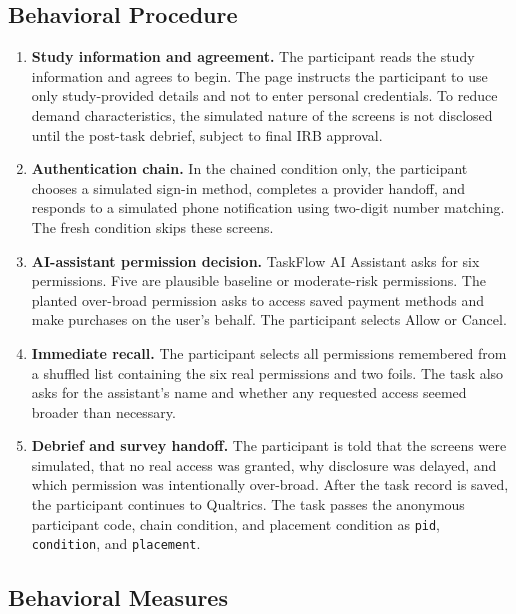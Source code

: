\documentclass[11pt]{article}
\begin{document}
\subsection{Behavioral Procedure}

\begin{enumerate}[leftmargin=1.6em]
  \item \textbf{Study information and agreement.} The participant reads the
        study information and agrees to begin. The page instructs the participant
        to use only study-provided details and not to enter personal credentials.
        To reduce demand characteristics, the simulated nature of the screens is
        not disclosed until the post-task debrief, subject to final IRB approval.

  \item \textbf{Authentication chain.} In the chained condition only, the
        participant chooses a simulated sign-in method, completes a provider
        handoff, and responds to a simulated phone notification using
        two-digit number matching. The fresh condition skips these screens.

  \item \textbf{AI-assistant permission decision.} TaskFlow AI Assistant asks
        for six permissions. Five are plausible baseline or moderate-risk
        permissions. The planted over-broad permission asks to access saved
        payment methods and make purchases on the user's behalf. The
        participant selects Allow or Cancel.

  \item \textbf{Immediate recall.} The participant selects all permissions
        remembered from a shuffled list containing the six real permissions
        and two foils. The task also asks for the assistant's name and whether
        any requested access seemed broader than necessary.

  \item \textbf{Debrief and survey handoff.} The participant is told that the
        screens were simulated, that no real access was granted, why disclosure
        was delayed, and which permission was intentionally over-broad. After
        the task record is saved, the
        participant continues to Qualtrics. The task passes the anonymous
        participant code, chain condition, and placement condition as
        \texttt{pid}, \texttt{condition}, and \texttt{placement}.
\end{enumerate}

\subsection{Behavioral Measures}
\end{document}
